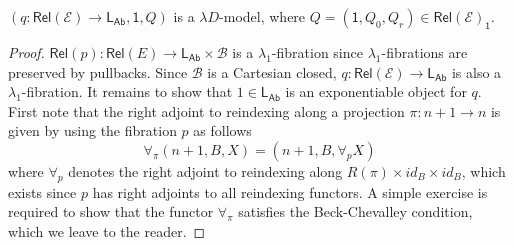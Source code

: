 \documentclass[a4paper,UKenglish]{lipics}
\newcommand{\LamOneFib}{$\lambda_1$-fibration\xspace}
\newcommand{\LamOneFibs}{$\lambda_1$-fibrations\xspace}
\newcommand{\msf}[1]{\mathsf{#1}} %
\newcommand{\LAb}{\msf{L}_{\msf{Ab}}}
\newcommand{\terminal}{\msf{1}}
\newcommand{\Rel}{\msf{Rel}}
\newcommand{\B}{\mathcal{B}}
\newcommand{\C}{\mathcal{C}}
\newcommand{\E}{\mathcal{E}}
\newcommand{\fibreE}[1]{\E_{_{#1}}}
\newcommand{\bracket}[1]{\left( #1 \right)}
\newcommand{\bbracket}[1]{\bigl( #1 \bigr)}
\begin{document}
\begin{theorem}
\label{thm:logUoM}
$(q:\Rel(\E) \rightarrow \LAb, \terminal, Q)$ is a $\lambda D$-model, where $Q = (\terminal, Q_0, Q_r) \in \Rel(\E)_\terminal$.
\end{theorem}
\begin{proof}
$\Rel(p):\Rel(E) \rightarrow \LAb \times \B$ is a \LamOneFib since \LamOneFibs are preserved by pullbacks. Since $\B$ is a Cartesian closed, $q:\Rel(\E) \rightarrow \LAb$ is also a \LamOneFib.
%
It remains to show that $1\in \LAb$ is an exponentiable object for $q$. First note that
the right adjoint to reindexing along a projection $\pi : n+1 \rightarrow n$ is given by using the fibration $p$ as follows
\[
\forall_\pi (n+1, B, X) = (n+1,B, \forall_{p} X)
\]
where $\forall_p$ denotes the right adjoint to reindexing along $R(\pi ) \times id_B \times id_B$,
which exists since $p$ has right adjoints to all reindexing functors. A simple exercise is required to show that the functor $\forall_\pi$ satisfies the Beck-Chevalley condition, which we leave to the reader.


%
%
 \end{proof}
\end{document}
